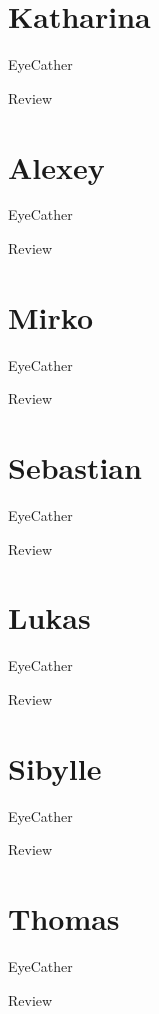 \documentclass[aspectratio=169,10pt]{beamer}
\begin{document}
\section{Katharina}
\begin{frame}[fragile]{EyeCather}
\end{frame}
\begin{frame}[t,fragile]{Review}
\end{frame}

\section{Alexey}
\begin{frame}[fragile]{EyeCather}
\end{frame}
\begin{frame}[t,fragile]{Review}
\end{frame}

\section{Mirko}
\begin{frame}[fragile]{EyeCather}
\end{frame}
\begin{frame}[t,fragile]{Review}
\end{frame}

\section{Sebastian}
\begin{frame}[fragile]{EyeCather}
\end{frame}
\begin{frame}[t,fragile]{Review}
\end{frame}

\section{Lukas}
\begin{frame}[fragile]{EyeCather}
\end{frame}
\begin{frame}[t,fragile]{Review}
\end{frame}

\section{Sibylle}
\begin{frame}[fragile]{EyeCather}
\end{frame}
\begin{frame}[t,fragile]{Review}
\end{frame}

\section{Thomas}
\begin{frame}[fragile]{EyeCather}
\end{frame}
\begin{frame}[t,fragile]{Review}
\end{frame}
\end{document}
